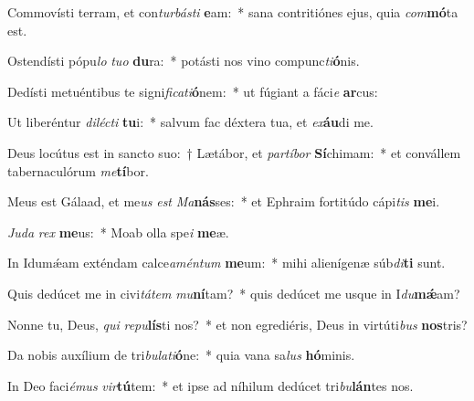 \item Commovísti terram, et con\textit{tur}\textit{bás}\textit{ti} \textbf{e}am:~* sana contritiónes ejus, quia \textit{com}\textbf{mó}ta est.
\item Ostendísti pópu\textit{lo} \textit{tu}\textit{o} \textbf{du}ra:~* potásti nos vino compunc\textit{ti}\textbf{ó}nis.
\item Dedísti metuéntibus te signi\textit{fi}\textit{ca}\textit{ti}\textbf{ó}nem:~* ut fúgiant a fáci\textit{e} \textbf{ar}cus:
\item Ut liberéntur \textit{di}\textit{léc}\textit{ti} \textbf{tu}i:~* salvum fac déxtera tua, et \textit{ex}\textbf{áu}di me.
\item Deus locútus est in sancto suo:~† Lætábor, et \textit{par}\textit{tí}\textit{bor} \textbf{Sí}chimam:~* et convállem tabernaculórum \textit{me}\textbf{tí}bor.
\item Meus est Gálaad, et me\textit{us} \textit{est} \textit{Ma}\textbf{nás}ses:~* et Ephraim fortitúdo cápi\textit{tis} \textbf{me}i.
\item \textit{Ju}\textit{da} \textit{rex} \textbf{me}us:~* Moab olla spe\textit{i} \textbf{me}æ.
\item In Idumǽam exténdam calce\textit{a}\textit{mén}\textit{tum} \textbf{me}um:~* mihi alienígenæ súb\textit{di}\textbf{ti} sunt.
\item Quis dedúcet me in civi\textit{tá}\textit{tem} \textit{mu}\textbf{ní}tam?~* quis dedúcet me usque in I\textit{du}\textbf{mǽ}am?
\item Nonne tu, Deus, \textit{qui} \textit{re}\textit{pu}\textbf{lís}ti nos?~* et non egrediéris, Deus in virtúti\textit{bus} \textbf{nos}tris?
\item Da nobis auxílium de tri\textit{bu}\textit{la}\textit{ti}\textbf{ó}ne:~* quia vana sa\textit{lus} \textbf{hó}minis.
\item In Deo faci\textit{é}\textit{mus} \textit{vir}\textbf{tú}tem:~* et ipse ad níhilum dedúcet tri\textit{bu}\textbf{lán}tes nos.
